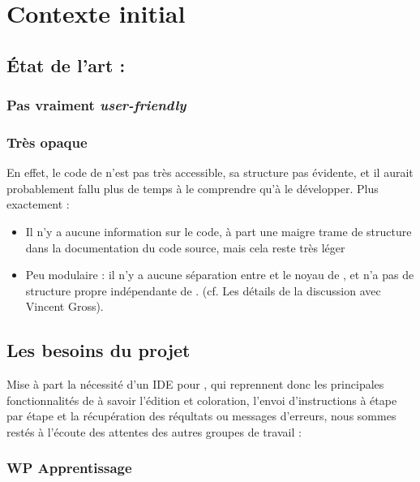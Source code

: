 \section{Contexte initial}

\subsection{État de l'art : \CoqIde{}}

\subsubsection{Pas vraiment \emph{user-friendly}}


\subsubsection{Très opaque}

En effet, le code de \CoqIde{} n'est pas très accessible, sa structure pas évidente, et il aurait probablement fallu plus de temps à le comprendre qu'à le développer. Plus exactement :

\begin{itemize}
  \item Il n'y a aucune information sur le code, à part une maigre trame de structure dans la documentation du code source, mais cela reste très léger
  \item Peu modulaire : il n'y a aucune séparation entre \CoqIde{} et le noyau de \Coq{}, et \CoqIde{} n'a pas de structure propre indépendante de \Coq{}. (cf. Les détails de la discussion avec Vincent Gross).
\end{itemize}
    
\subsection{Les besoins du projet \coquille}

Mise à part la nécessité d'un IDE pour \Coq{}, qui reprennent donc les principales fonctionnalités de \CoqIde{} à savoir l'édition et coloration, l'envoi d'instructions à \coqtop{} étape par étape et la récupération des réqultats ou messages d'erreurs, nous sommes restés à l'écoute des attentes des autres groupes de travail :

\subsubsection{WP Apprentissage}

